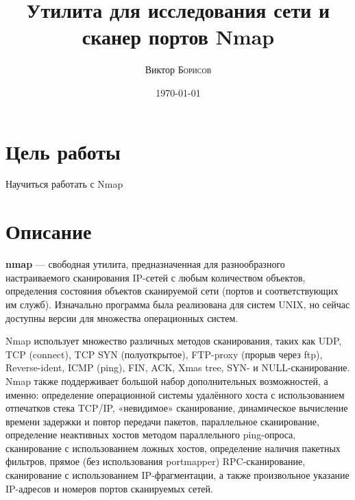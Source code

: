 \documentclass[10pt,a4paper]{article}
\title{Утилита для исследования сети и сканер портов Nmap} %
\author{Виктор \textsc{Борисов}} %
\date{\today} %
\begin{document}
\maketitle %

\newpage

\tableofcontents

\newpage


\section{Цель работы}

Научиться работать с Nmap



\section{Описание}

\textbf{nmap} — свободная утилита, предназначенная для разнообразного настраиваемого сканирования IP-сетей с любым количеством объектов, определения состояния объектов сканируемой сети (портов и соответствующих им служб). Изначально программа была реализована для систем UNIX, но сейчас доступны версии для множества операционных систем.

Nmap использует множество различных методов сканирования, таких как UDP, TCP (connect), TCP SYN (полуоткрытое), FTP-proxy (прорыв через ftp), Reverse-ident, ICMP (ping), FIN, ACK, Xmas tree, SYN- и NULL-сканирование. Nmap также поддерживает большой набор дополнительных возможностей, а именно: определение операционной системы удалённого хоста с использованием отпечатков стека TCP/IP, «невидимое» сканирование, динамическое вычисление времени задержки и повтор передачи пакетов, параллельное сканирование, определение неактивных хостов методом параллельного ping-опроса, сканирование с использованием ложных хостов, определение наличия пакетных фильтров, прямое (без использования portmapper) RPC-сканирование, сканирование с использованием IP-фрагментации, а также произвольное указание IP-адресов и номеров портов сканируемых сетей.
 
\end{document}
